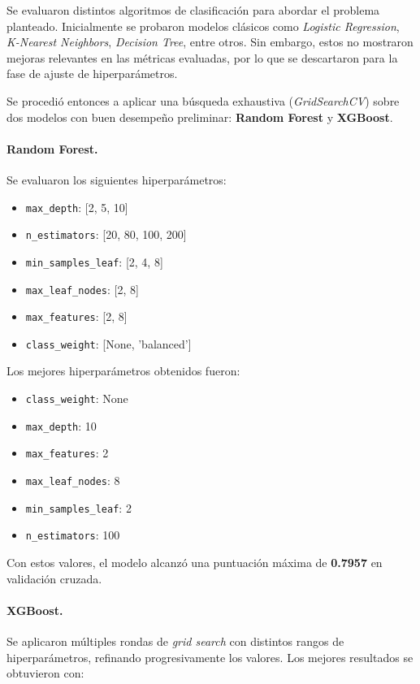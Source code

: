 \documentclass[12pt]{article}
\begin{document}
Se evaluaron distintos algoritmos de clasificación para abordar el problema planteado. Inicialmente se probaron modelos clásicos como \textit{Logistic Regression}, \textit{K-Nearest Neighbors}, \textit{Decision Tree}, entre otros. Sin embargo, estos no mostraron mejoras relevantes en las métricas evaluadas, por lo que se descartaron para la fase de ajuste de hiperparámetros.

Se procedió entonces a aplicar una búsqueda exhaustiva (\textit{GridSearchCV}) sobre dos modelos con buen desempeño preliminar: \textbf{Random Forest} y \textbf{XGBoost}.

\paragraph{Random Forest.}
Se evaluaron los siguientes hiperparámetros:

\begin{itemize}
    \item \texttt{max\_depth}: [2, 5, 10]
    \item \texttt{n\_estimators}: [20, 80, 100, 200]
    \item \texttt{min\_samples\_leaf}: [2, 4, 8]
    \item \texttt{max\_leaf\_nodes}: [2, 8]
    \item \texttt{max\_features}: [2, 8]
    \item \texttt{class\_weight}: [None, 'balanced']
\end{itemize}

Los mejores hiperparámetros obtenidos fueron:

\begin{itemize}
    \item \texttt{class\_weight}: None
    \item \texttt{max\_depth}: 10
    \item \texttt{max\_features}: 2
    \item \texttt{max\_leaf\_nodes}: 8
    \item \texttt{min\_samples\_leaf}: 2
    \item \texttt{n\_estimators}: 100
\end{itemize}

Con estos valores, el modelo alcanzó una puntuación máxima de \textbf{0.7957} en validación cruzada.


\paragraph{XGBoost.}
Se aplicaron múltiples rondas de \textit{grid search} con distintos rangos de hiperparámetros, refinando progresivamente los valores. Los mejores resultados se obtuvieron con:
\end{document}
